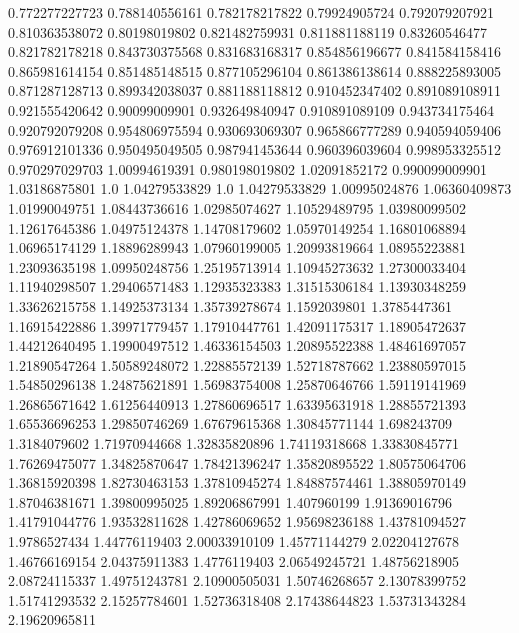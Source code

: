  0.772277227723   0.788140556161
 0.782178217822    0.79924905724
 0.792079207921   0.810363538072
  0.80198019802   0.821482759931
 0.811881188119    0.83260546477
 0.821782178218   0.843730375568
 0.831683168317   0.854856196677
 0.841584158416   0.865981614154
 0.851485148515   0.877105296104
 0.861386138614   0.888225893005
 0.871287128713   0.899342038037
 0.881188118812   0.910452347402
 0.891089108911   0.921555420642
  0.90099009901   0.932649840947
 0.910891089109   0.943734175464
 0.920792079208   0.954806975594
 0.930693069307   0.965866777289
 0.940594059406   0.976912101336
 0.950495049505   0.987941453644
 0.960396039604   0.998953325512
 0.970297029703    1.00994619391
 0.980198019802    1.02091852172
 0.990099009901    1.03186875801
            1.0    1.04279533829
            1.0    1.04279533829
  1.00995024876    1.06360409873
  1.01990049751    1.08443736616
  1.02985074627    1.10529489795
  1.03980099502    1.12617645386
  1.04975124378    1.14708179602
  1.05970149254    1.16801068894
  1.06965174129    1.18896289943
  1.07960199005    1.20993819664
  1.08955223881    1.23093635198
  1.09950248756    1.25195713914
  1.10945273632    1.27300033404
  1.11940298507    1.29406571483
  1.12935323383    1.31515306184
  1.13930348259    1.33626215758
  1.14925373134    1.35739278674
   1.1592039801     1.3785447361
  1.16915422886    1.39971779457
  1.17910447761    1.42091175317
  1.18905472637    1.44212640495
  1.19900497512    1.46336154503
  1.20895522388    1.48461697057
  1.21890547264    1.50589248072
  1.22885572139    1.52718787662
  1.23880597015    1.54850296138
  1.24875621891    1.56983754008
  1.25870646766    1.59119141969
  1.26865671642    1.61256440913
  1.27860696517    1.63395631918
  1.28855721393    1.65536696253
  1.29850746269    1.67679615368
  1.30845771144      1.698243709
   1.3184079602    1.71970944668
  1.32835820896    1.74119318668
  1.33830845771    1.76269475077
  1.34825870647    1.78421396247
  1.35820895522    1.80575064706
  1.36815920398    1.82730463153
  1.37810945274    1.84887574461
  1.38805970149    1.87046381671
  1.39800995025    1.89206867991
    1.407960199    1.91369016796
  1.41791044776    1.93532811628
  1.42786069652    1.95698236188
  1.43781094527     1.9786527434
  1.44776119403    2.00033910109
  1.45771144279    2.02204127678
  1.46766169154    2.04375911383
   1.4776119403    2.06549245721
  1.48756218905    2.08724115337
  1.49751243781    2.10900505031
  1.50746268657    2.13078399752
  1.51741293532    2.15257784601
  1.52736318408    2.17438644823
  1.53731343284    2.19620965811
